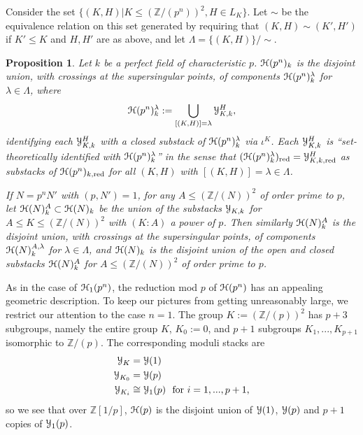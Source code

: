 \documentclass[11pt]{amsart}
\newtheorem{proposition}[subsection]{Proposition}
\theoremstyle{definition}
\begin{document}
Consider the set $\{(K,H)|K \leq (\mathbb{Z}/(p^n))^2,H \in L_K\}$. Let $\sim$ be the equivalence relation on this set generated by requiring that $(K,H) \sim (K',H')$ if $K' \leq K$ and $H,H'$ are as above, and let $\Lambda = \{(K,H)\}/\sim$.

\begin{proposition}\label{hcomps}
Let $k$ be a perfect field of characteristic $p$. ${\mathbf{\EuScript{H}}}(p^n)_k$ is the disjoint union, with crossings at the supersingular points, of components ${\mathbf{\EuScript{H}}}(p^n)^\lambda_k$ for $\lambda \in \Lambda$, where 
\begin{displaymath}
{\mathbf{\EuScript{H}}}(p^n)^\lambda_k := \bigcup_{[(K,H)] = \lambda} {\mathbf{\EuScript{Y}}}^H_{K,k},
\end{displaymath}
identifying each ${\mathbf{\EuScript{Y}}}^H_{K,k}$ with a closed substack of ${\mathbf{\EuScript{H}}}(p^n)^\lambda_k$ via $\iota^K$. Each ${\mathbf{\EuScript{Y}}}^H_{K,k}$ is ``set-theoretically identified with ${\mathbf{\EuScript{H}}}(p^n)^\lambda_k$'' in the sense that $({\mathbf{\EuScript{H}}}(p^n)^\lambda_k)_{\mathrm{red}} = {\mathbf{\EuScript{Y}}}^H_{K,k,\mathrm{red}}$ as substacks of ${\mathbf{\EuScript{H}}}(p^n)_{k,\mathrm{red}}$ for all $(K,H)$ with $[(K,H)] = \lambda \in \Lambda$.

If $N = p^nN'$ with $(p,N') = 1$, for any $A \leq (\mathbb{Z}/(N))^2$ of order prime to $p$, let ${\mathbf{\EuScript{H}}}(N)^A_k \subset {\mathbf{\EuScript{H}}}(N)_k$ be the union of the substacks ${\mathbf{\EuScript{Y}}}_{K,k}$ for $A \leq K \leq (\mathbb{Z}/(N))^2$ with $(K:A)$ a power of $p$. Then similarly ${\mathbf{\EuScript{H}}}(N)^A_k$ is the disjoint union, with crossings at the supersingular points, of components ${\mathbf{\EuScript{H}}}(N)^{A,\lambda}_k$ for $\lambda \in \Lambda$, and ${\mathbf{\EuScript{H}}}(N)_k$ is the disjoint union of the open and closed substacks ${\mathbf{\EuScript{H}}}(N)^A_k$ for $A \leq (\mathbb{Z}/(N))^2$ of order prime to $p$. 
\end{proposition}

As in the case of ${\mathbf{\EuScript{H}}}_1(p^n)$, the reduction mod $p$ of ${\mathbf{\EuScript{H}}}(p^n)$ has an appealing geometric description. To keep our pictures from getting unreasonably large, we restrict our attention to the case $n=1$. The group $K := (\mathbb{Z}/(p))^2$ has $p+3$ subgroups, namely the entire group $K$, $K_0 := 0$, and $p+1$ subgroups $K_1,...,K_{p+1}$ isomorphic to $\mathbb{Z}/(p)$. The corresponding moduli stacks are 
\begin{align*}
{\mathbf{\EuScript{Y}}}_K & = {\mathbf{\EuScript{Y}}}(1) \\
{\mathbf{\EuScript{Y}}}_{K_0} & = {\mathbf{\EuScript{Y}}}(p) \\
{\mathbf{\EuScript{Y}}}_{K_i} & \cong {\mathbf{\EuScript{Y}}}_1(p)\:\:\:\textrm{for $i = 1,...,p+1$,}
\end{align*}
so we see that over $\mathbb{Z}[1/p]$, ${\mathbf{\EuScript{H}}}(p)$ is the disjoint union of ${\mathbf{\EuScript{Y}}}(1)$, ${\mathbf{\EuScript{Y}}}(p)$ and $p+1$ copies of ${\mathbf{\EuScript{Y}}}_1(p)$.
\end{document}
